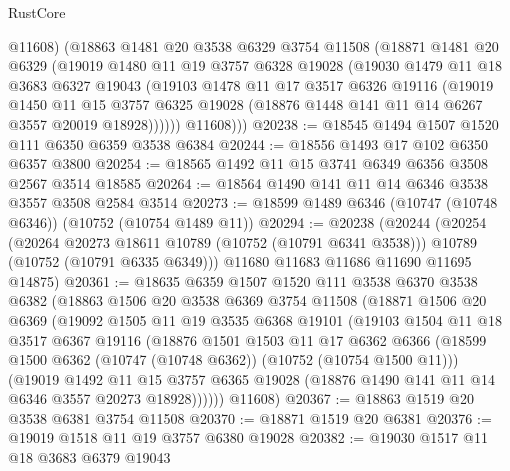 \begin{lexlean}{RustCore}
\begin{coremodule}
          @11608)
        (@18863
          @1481
          @20
          @3538
          @6329
          @3754
          @11508
          (@18871
            @1481
            @20
            @6329
            (@19019
              @1480
              @11
              @19
              @3757
              @6328
              @19028
              (@19030
                @1479
                @11
                @18
                @3683
                @6327
                @19043
                (@19103
                  @1478
                  @11
                  @17
                  @3517
                  @6326
                  @19116
                  (@19019
                    @1450
                    @11
                    @15
                    @3757
                    @6325
                    @19028
                    (@18876 @1448 @141 @11 @14 @6267 @3557 @20019 @18928))))))
          @11608)))
@20238 := @18545 @1494 @1507 @1520 @111 @6350 @6359 @3538 @6384
@20244 := @18556 @1493 @17 @102 @6350 @6357 @3800
@20254 := @18565 @1492 @11 @15 @3741 @6349 @6356 @3508 @2567 @3514 @18585
@20264 := @18564 @1490 @141 @11 @14 @6346 @3538 @3557 @3508 @2584 @3514
@20273 := @18599 @1489 @6346 (@10747 (@10748 @6346)) (@10752 (@10754 @1489 @11))
@20294 := @20238
    (@20244
      (@20254
        (@20264 @20273 @18611 @10789 (@10752 (@10791 @6341 @3538)))
        @10789
        (@10752 (@10791 @6335 @6349)))
      @11680
      @11683
      @11686
      @11690
      @11695
      @14875)
@20361 := @18635
    @6359
    @1507
    @1520
    @111
    @3538
    @6370
    @3538
    @6382
    (@18863
      @1506
      @20
      @3538
      @6369
      @3754
      @11508
      (@18871
        @1506
        @20
        @6369
        (@19092
          @1505
          @11
          @19
          @3535
          @6368
          @19101
          (@19103
            @1504
            @11
            @18
            @3517
            @6367
            @19116
            (@18876
              @1501
              @1503
              @11
              @17
              @6362
              @6366
              (@18599 @1500 @6362 (@10747 (@10748 @6362)) (@10752 (@10754 @1500 @11)))
              (@19019
                @1492
                @11
                @15
                @3757
                @6365
                @19028
                (@18876 @1490 @141 @11 @14 @6346 @3557 @20273 @18928))))))
      @11608)
@20367 := @18863 @1519 @20 @3538 @6381 @3754 @11508
@20370 := @18871 @1519 @20 @6381
@20376 := @19019 @1518 @11 @19 @3757 @6380 @19028
@20382 := @19030 @1517 @11 @18 @3683 @6379 @19043

\end{coremodule}
\end{lexlean}
